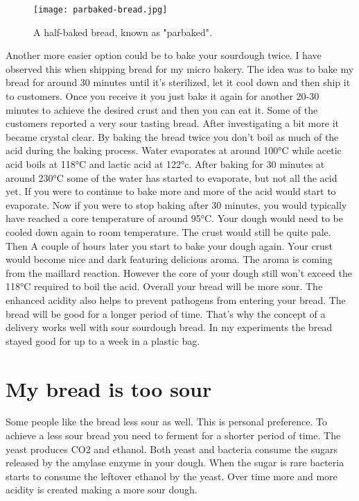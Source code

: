 \begin{figure}[!htb]
  \texttt{[image: parbaked-bread.jpg]}
  \caption{A half-baked bread, known as "parbaked".}
  \label{fig:parbaked-bread}
\end{figure}

Another more easier option could be to bake your sourdough
twice. I have observed this when shipping bread for my micro
bakery. The idea was to bake my bread for around 30 minutes
until it's sterilized, let it cool down and then ship it
to customers. Once you receive it you just bake it again
for another 20-30 minutes to achieve the desired crust and
then you can eat it. Some of the customers reported a very sour
tasting bread. After investigating a bit more it became
crystal clear. By baking the bread twice you don't boil
as much of the acid during the baking process. Water
evaporates at around 100°C while acetic acid boils at
118°C and lactic acid at 122°c. After baking for 30 minutes
at around 230°C some of the water has started to evaporate,
but not all the acid yet. If you were to continue to bake more
and more of the acid would start to evaporate. Now if you were
to stop baking after 30 minutes, you would typically have reached
a core temperature of around 95°C. Your dough would need
to be cooled down again to room temperature. The crust would
still be quite pale. Then A couple of hours later you start
to bake your dough again. Your crust would become nice and
dark featuring delicious aroma. The aroma is coming from the
maillard reaction. However the core of your dough still won't
exceed the 118°C required to boil the acid. Overall your
bread will be more sour. The enhanced acidity also helps
to prevent pathogens from entering your bread. The bread
will be good for a longer period of time. That's why
the concept of a delivery works well with sour sourdough bread.
In my experiments the bread stayed good for up to a week
in a plastic bag.

\section{My bread is too sour}

Some people like the bread less sour as well. This
is personal preference. To achieve a less sour bread
you need to ferment for a shorter period of time.
The yeast produces CO2 and ethanol. Both yeast and
bacteria consume the sugars released by the amylase enzyme
in your dough. When the sugar is rare bacteria starts to
consume the leftover ethanol by the yeast. Over time more
and more acidity is created making a more sour dough.

